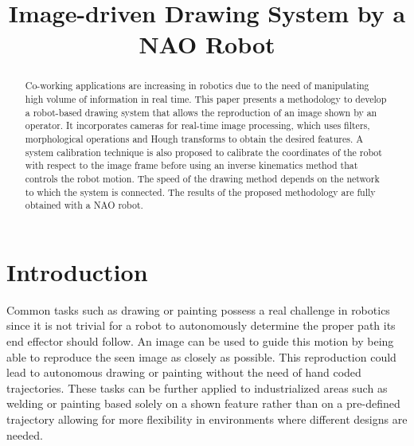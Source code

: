 \documentclass[conference]{IEEEtran}
\begin{document}
\title{Image-driven Drawing System by a NAO Robot}
\author{
}
\maketitle
\begin{abstract}
Co-working applications are increasing in robotics due to the need of manipulating high volume of information in real time. This paper presents a methodology to develop a robot-based drawing system that allows the reproduction of an image shown by an operator. It incorporates cameras for real-time image processing, which uses filters, morphological operations and Hough transforms to obtain the desired features. A system calibration technique is also proposed to calibrate the coordinates of the robot with respect to the image frame before using an inverse kinematics method that controls the robot motion. The speed of the drawing method depends on the network to which the system is connected. The results of the proposed methodology are fully obtained with a NAO robot.
\end{abstract}
\IEEEpeerreviewmaketitle

\section{Introduction}

Common tasks such as drawing or painting possess a real challenge in robotics since it is not trivial for a robot to autonomously determine the proper path its end effector should follow. An image can be used to guide this motion by being able to reproduce the seen image as closely as possible. This reproduction could lead to autonomous drawing or painting without the need of hand coded trajectories. These tasks can be further applied to industrialized areas such as welding or painting based solely on a shown feature rather than on a pre-defined trajectory allowing for more flexibility in environments where different designs are needed.
\end{document}

